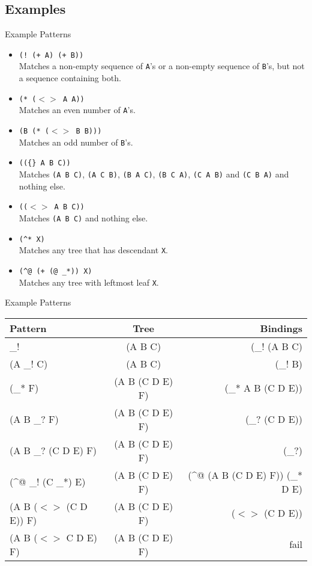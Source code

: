 \documentclass[8pt]{beamer}
\begin{document}
\subsection{Examples}
\begin{frame}{Example Patterns}
  \begin{itemize}
  \item \texttt{(!~(+ A) (+ B))}\\Matches a non-empty sequence of \texttt{A}'s or a non-empty sequence of \texttt{B}'s, but not a sequence containing both.
  \item \texttt{(* ($<>$ A A))}\\Matches an even number of \texttt{A}'s.
  \item \texttt{(B (* ($<>$ B B)))}\\Matches an odd number of \texttt{B}'s.
  \item \texttt{((\{\} A B C))}\\Matches \texttt{(A B C)}, \texttt{(A C B)}, \texttt{(B A C)}, \texttt{(B C A)}, \texttt{(C A B)} and \texttt{(C B A)} and nothing else.
  \item \texttt{(($<>$ A B C))}\\Matches \texttt{(A B C)} and nothing else.
  \item \texttt{(\^{}* X)}\\Matches any tree that has descendant \texttt{X}.
  \item \texttt{(\^{}@ (+ (@ \_*)) X)}\\Matches any tree with leftmost leaf \texttt{X}.
  \end{itemize}

\end{frame}
\begin{frame}{Example Patterns}
    \begin{tabular} {l|c|r}
    Pattern  & Tree &   Bindings\\
    \hline
    \_!   & (A B C) & (\_! (A B C)\\
    (A \_! C)     &        (A B C)   &              (\_! B)\\
    (\_* F)       &        (A B (C D E) F)   &      (\_*  A B (C D E))\\
    (A B \_? F)   &        (A B (C D E) F)   &      (\_? (C D E))\\
    (A B \_? (C D E) F)  & (A B (C D E) F)   &      (\_?)\\
    (\^{}@ \_! (C \_*) E)   & (A B (C D E) F)   &   (\^{}@ (A B (C D E) F))  (\_* D E)\\
    (A B ($<>$ (C D E)) F)  & (A B (C D E) F)   &   ($<>$ (C D E))\\
    (A B ($<>$ C D E) F)    & (A B (C D E) F)  &   fail\\
  \end{tabular}
\end{frame}
\end{document}

